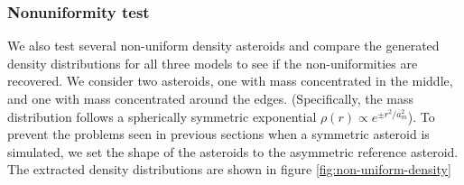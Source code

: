 \documentclass[fleqn,usenatbib]{mnras}
\begin{document}
\subsubsection{Nonuniformity test}
\label{sec:non-uniform-density}

We also test several non-uniform density asteroids and compare the generated density distributions for all three models to see if the non-uniformities are recovered. We consider two asteroids, one with mass concentrated in the middle, and one with mass concentrated around the edges. (Specifically, the mass distribution follows a spherically symmetric exponential $\rho(r) \propto e^{\pm r^2/a_m^2}$). To prevent the problems seen in previous sections when a symmetric asteroid is simulated, we set the shape of the asteroids to the asymmetric reference asteroid. The extracted density distributions are shown in figure \ref{fig:non-uniform-density}
\end{document}
